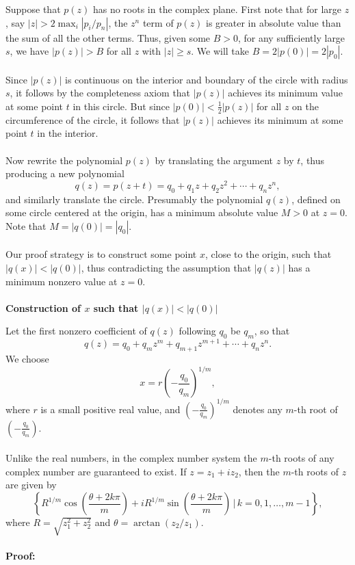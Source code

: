 Suppose that \(p(z)\) has no roots in the complex plane. First note that for large \(z\), say \(|z| > 2 \max_i |p_i/p_n|\), the \(z^n\) term of \(p(z)\) is greater in absolute value than the sum of all the other terms. Thus, given some \(B > 0\), for any sufficiently large \(s\), we have \(|p(z)| > B\) for all \(z\) with \(|z| \geq s\). We will take \(B = 2|p(0)| = 2|p_0|\).
\\\\
Since \(|p(z)|\) is continuous on the interior and boundary of the circle with radius \(s\), it follows by the completeness axiom that \(|p(z)|\) achieves its minimum value at some point \(t\) in this circle. But since \(|p(0)| < \frac{1}{2} |p(z)|\) for all \(z\) on the circumference of the circle, it follows that \(|p(z)|\) achieves its minimum at some point \(t\) in the interior.
\\\\
Now rewrite the polynomial \(p(z)\) by translating the argument \(z\) by \(t\), thus producing a new polynomial
\[
	q(z) = p(z + t) = q_0 + q_1 z + q_2 z^2 + \cdots + q_n z^n,
\]
and similarly translate the circle. Presumably the polynomial \(q(z)\), defined on some circle centered at the origin, has a minimum absolute value \(M > 0\) at \(z = 0\). Note that \(M = |q(0)| = |q_0|\).
\\\\
Our proof strategy is to construct some point \(x\), close to the origin, such that \(|q(x)| < |q(0)|\), thus contradicting the assumption that \(|q(z)|\) has a minimum nonzero value at \(z = 0\).
\\\\
\textbf{Construction of \(x\) such that \(|q(x)| < |q(0)|\)}

Let the first nonzero coefficient of \(q(z)\) following \(q_0\) be \(q_m\), so that
\[
	q(z) = q_0 + q_m z^m + q_{m+1} z^{m+1} + \cdots + q_n z^n.
\]
We choose
\[
	x = r \left(-\frac{q_0}{q_m}\right)^{1/m},
\]
where \(r\) is a small positive real value, and \(\left(-\frac{q_0}{q_m}\right)^{1/m}\) denotes any \(m\)-th root of \(\left(-\frac{q_0}{q_m}\right)\).
\\\\
Unlike the real numbers, in the complex number system the \(m\)-th roots of any complex number are guaranteed to exist. If \(z = z_1 + i z_2\), then the \(m\)-th roots of \(z\) are given by
\[
	\left\{ R^{1/m} \cos\left(\frac{\theta + 2k\pi}{m}\right) + i R^{1/m} \sin\left(\frac{\theta + 2k\pi}{m}\right) \,\bigg|\, k = 0, 1, \ldots, m-1 \right\},
\]
where \(R = \sqrt{z_1^2 + z_2^2}\) and \(\theta = \arctan(z_2 / z_1)\).
\\\\
\textbf{Proof:} 

